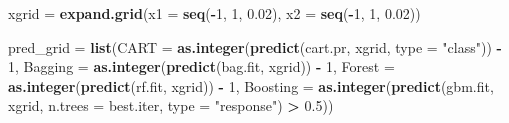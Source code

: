 \documentclass[
]{book}
\newenvironment{Shaded}{\begin{snugshade}}{\end{snugshade}}
\newcommand{\AttributeTok}[1]{\textcolor[rgb]{0.13,0.29,0.53}{#1}}
\newcommand{\DecValTok}[1]{\textcolor[rgb]{0.00,0.00,0.81}{#1}}
\newcommand{\FloatTok}[1]{\textcolor[rgb]{0.00,0.00,0.81}{#1}}
\newcommand{\FunctionTok}[1]{\textcolor[rgb]{0.13,0.29,0.53}{\textbf{#1}}}
\newcommand{\NormalTok}[1]{#1}
\newcommand{\OtherTok}[1]{\textcolor[rgb]{0.56,0.35,0.01}{#1}}
\newcommand{\SpecialCharTok}[1]{\textcolor[rgb]{0.81,0.36,0.00}{\textbf{#1}}}
\newcommand{\StringTok}[1]{\textcolor[rgb]{0.31,0.60,0.02}{#1}}
\begin{document}
\begin{Shaded}
\begin{Highlighting}[]
\NormalTok{xgrid }\OtherTok{=} \FunctionTok{expand.grid}\NormalTok{(}\AttributeTok{x1 =} \FunctionTok{seq}\NormalTok{(}\SpecialCharTok{{-}}\DecValTok{1}\NormalTok{, }\DecValTok{1}\NormalTok{, }\FloatTok{0.02}\NormalTok{), }\AttributeTok{x2 =} \FunctionTok{seq}\NormalTok{(}\SpecialCharTok{{-}}\DecValTok{1}\NormalTok{, }\DecValTok{1}\NormalTok{, }\FloatTok{0.02}\NormalTok{))}

\NormalTok{pred\_grid }\OtherTok{=} \FunctionTok{list}\NormalTok{(}\AttributeTok{CART =} \FunctionTok{as.integer}\NormalTok{(}\FunctionTok{predict}\NormalTok{(cart.pr, xgrid, }\AttributeTok{type =} \StringTok{"class"}\NormalTok{)) }\SpecialCharTok{{-}}
    \DecValTok{1}\NormalTok{, }\AttributeTok{Bagging =} \FunctionTok{as.integer}\NormalTok{(}\FunctionTok{predict}\NormalTok{(bag.fit, xgrid)) }\SpecialCharTok{{-}} \DecValTok{1}\NormalTok{, }\AttributeTok{Forest =} \FunctionTok{as.integer}\NormalTok{(}\FunctionTok{predict}\NormalTok{(rf.fit,}
\NormalTok{    xgrid)) }\SpecialCharTok{{-}} \DecValTok{1}\NormalTok{, }\AttributeTok{Boosting =} \FunctionTok{as.integer}\NormalTok{(}\FunctionTok{predict}\NormalTok{(gbm.fit, xgrid,}
    \AttributeTok{n.trees =}\NormalTok{ best.iter, }\AttributeTok{type =} \StringTok{"response"}\NormalTok{) }\SpecialCharTok{\textgreater{}} \FloatTok{0.5}\NormalTok{))}


\end{Highlighting}
\end{Shaded}
\end{document}
